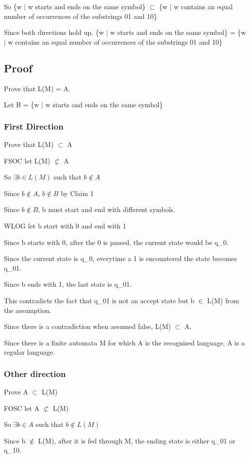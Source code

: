 \documentclass[letterpaper, 11pt]{article}
\begin{document}
So \{w $\mid$ w starts and ends on the same symbol\} $\subset$ \{w $\mid$ w contains an equal number of occurrences of the substrings 01 and 10\}

Since both directions hold up, \{w $\mid$ w starts and ends on the same symbol\} = \{w $\mid$ w contains an equal number of occurrences of the substrings 01 and 10\}
\subsection*{Proof}
Prove that L(M) = A.

Let B = \{w $\mid$ w starts and ends on the same symbol\}
\subsubsection*{First Direction}
Prove that L(M) $\subset$ A

FSOC let L(M) $\not\subset$ A

So $\exists b \in L(M)$ such that $b \notin A$

Since $b \notin A$, $b \notin B$ by Claim 1

Since $b \notin B$, b must start and end with different symbols.

WLOG let b start with 0 and end with 1

Since b starts with 0, after the 0 is passed, the current state would be q\_0.

Since the current state is q\_0, everytime a 1 is encountered the state becomes q\_01.

Since b ends with 1, the last state is q\_01.

This contradicts the fact that q\_01 is not an accept state but b $\in$ L(M) from the assumption.

Since there is a contradiction when assumed false, L(M) $\subset$ A.

Since there is a finite automata M for which A is the recognized language, A is a regular language.

\subsubsection*{Other direction}
Prove A $\subset$ L(M)

FOSC let A $\not\subset$ L(M)

So $\exists b \in A$ such that $b \notin L(M)$

Since b $\notin$ L(M), after it is fed through M, the ending state is either q\_01 or q\_10.
\end{document}
